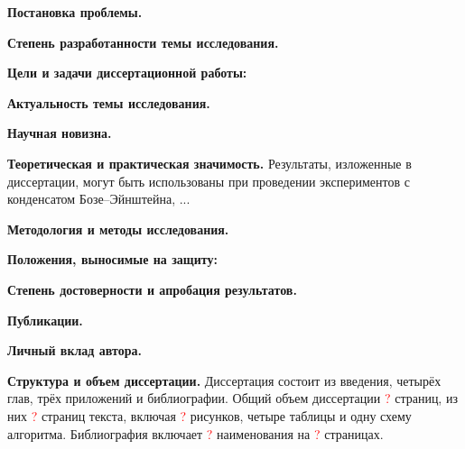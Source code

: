 \documentclass[candidate, href, colorlinks]{disser}
\begin{document}


\clearpage


\textbf{Постановка проблемы.} %

\textbf{Степень разработанности темы исследования.} %

\textbf{Цели и задачи диссертационной работы:}

\textbf{Актуальность темы исследования.}

\textbf{Научная новизна.}

\textbf{Теоретическая и практическая значимость.}
Результаты, изложенные в диссертации, могут быть использованы при проведении экспериментов с конденсатом Бозе--Эйнштейна, ...

\textbf{Методология и методы исследования.} %

\textbf{Положения, выносимые на защиту:}

\textbf{Степень достоверности и апробация результатов.}

\textbf{Публикации.}

\textbf{Личный вклад автора.}

\textbf{Структура и объем диссертации.}
Диссертация состоит из введения, четырёх глав, трёх приложений и библиографии.
Общий объем диссертации \textcolor{red}{?} страниц, из них \textcolor{red}{?} страниц текста, включая \textcolor{red}{?} рисунков, четыре таблицы и одну схему алгоритма.
Библиография включает \textcolor{red}{?} наименования на \textcolor{red}{?} страницах.

\end{document}
